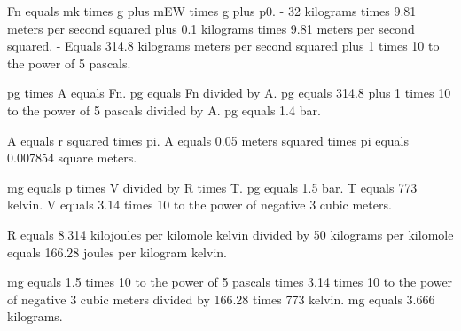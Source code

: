 Fn equals mk times g plus mEW times g plus p0.  
- 32 kilograms times 9.81 meters per second squared plus 0.1 kilograms times 9.81 meters per second squared.  
- Equals 314.8 kilograms meters per second squared plus 1 times 10 to the power of 5 pascals.  

pg times A equals Fn.  
pg equals Fn divided by A.  
pg equals 314.8 plus 1 times 10 to the power of 5 pascals divided by A.  
pg equals 1.4 bar.  

A equals r squared times pi.  
A equals 0.05 meters squared times pi equals 0.007854 square meters.  

mg equals p times V divided by R times T.  
pg equals 1.5 bar.  
T equals 773 kelvin.  
V equals 3.14 times 10 to the power of negative 3 cubic meters.  

R equals 8.314 kilojoules per kilomole kelvin divided by 50 kilograms per kilomole equals 166.28 joules per kilogram kelvin.  

mg equals 1.5 times 10 to the power of 5 pascals times 3.14 times 10 to the power of negative 3 cubic meters divided by 166.28 times 773 kelvin.  
mg equals 3.666 kilograms.